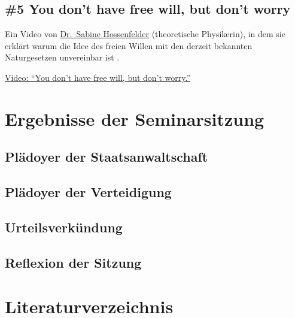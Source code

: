 \documentclass[
  a4paper,
]{report}
\newlength{\cslhangindent}
\newlength{\cslentryspacingunit} %
\newenvironment{CSLReferences}[2] %
 {%
  \setlength{\parindent}{0pt}
  \ifodd #1
  \let\oldpar\par
  \def\par{\hangindent=\cslhangindent\oldpar}
  \fi
  \setlength{\parskip}{#2\cslentryspacingunit}
 }%
 {}
\begin{document}
\hypertarget{you-dont-have-free-will-but-dont-worry}{%
\section{\#5 You don't have free will, but don't worry}\label{you-dont-have-free-will-but-dont-worry}}

Ein Video von \href{https://sabinehossenfelder.com}{Dr.~Sabine Hossenfelder} (theoretische Physikerin), in dem sie erklärt warum die Idee des freien Willen mit den derzeit bekannten Naturgesetzen unvereinbar ist \citep{Hossenfelder2020}.

\href{https://www.youtube.com/watch?v=zpU_e3jh_FY}{Video: ``You don't have free will, but don't worry.''}

\hypertarget{results}{%
\chapter{Ergebnisse der Seminarsitzung}\label{results}}

\hypertarget{pr-plea}{%
\section{Plädoyer der Staatsanwaltschaft}\label{pr-plea}}

\hypertarget{def-plea}{%
\section{Plädoyer der Verteidigung}\label{def-plea}}

\hypertarget{sentencing}{%
\section{Urteilsverkündung}\label{sentencing}}

\hypertarget{reflection}{%
\section{Reflexion der Sitzung}\label{reflection}}

\hypertarget{literaturverzeichnis}{%
\chapter*{Literaturverzeichnis}\label{literaturverzeichnis}}

\hypertarget{refs}{}
\begin{CSLReferences}{0}{0}
\end{CSLReferences}

  
\end{document}
